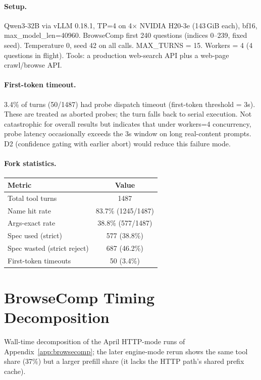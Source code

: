 \paragraph{Setup.}
Qwen3-32B via vLLM 0.18.1, TP=4 on 4$\times$ NVIDIA H20-3e (143\,GiB each), bf16, max\_model\_len=40960.
BrowseComp first 240 questions (indices 0--239, fixed seed).
Temperature 0, seed 42 on all calls.
MAX\_TURNS = 15. Workers = 4 (4 questions in flight).
Tools: a production web-search API plus a web-page crawl/browse API.

\paragraph{First-token timeout.}
3.4\% of turns (50/1487) had probe dispatch timeout (first-token threshold = 3s).
These are treated as aborted probes; the turn falls back to serial execution.
Not catastrophic for overall results but indicates that under workers=4 concurrency, probe latency occasionally exceeds the 3s window on long real-content prompts.
D2 (confidence gating with earlier abort) would reduce this failure mode.

\paragraph{Fork statistics.}
\begin{center}
\small
\begin{tabular}{lc}
\toprule
Metric & Value \\
\midrule
Total tool turns & 1487 \\
Name hit rate & 83.7\% (1245/1487) \\
Args-exact rate & 38.8\% (577/1487) \\
Spec used (strict) & 577 (38.8\%) \\
Spec wasted (strict reject) & 687 (46.2\%) \\
First-token timeouts & 50 (3.4\%) \\
\bottomrule
\end{tabular}
\end{center}

\section{BrowseComp Timing Decomposition}
\label{app:timing}

Wall-time decomposition of the April HTTP-mode runs of Appendix~\ref{app:browsecomp};
the later engine-mode rerun shows the same tool share (37\%) but a larger prefill share
(it lacks the HTTP path's shared prefix cache).

